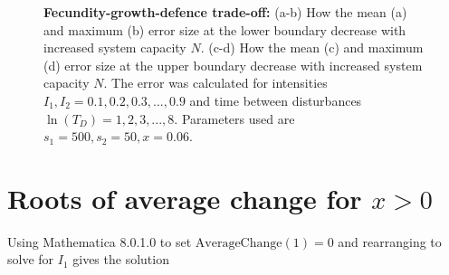 \begin{figure}[th]
  \label{fig:fullapprox}
   \caption{\textbf{Fecundity-growth-defence trade-off:} (a-b)  How the mean (a) and maximum (b) error size at the lower boundary decrease with increased system capacity $N$. (c-d) How the mean (c) and maximum (d) error size at the upper boundary decrease with increased system capacity $N$. The error was calculated for intensities $I_1,I_2=0.1,0.2,0.3,...,0.9$ and time between disturbances $\ln(T_D)=1,2,3,...,8.$ Parameters used are $s_1=500,s_2=50,x=0.06$.}
    \end{figure}
 
 \section{Roots of average change for $x>0$}
 Using Mathematica 8.0.1.0 to set $\text{AverageChange}(1)=0$ and rearranging to solve for $I_1$ gives the solution
